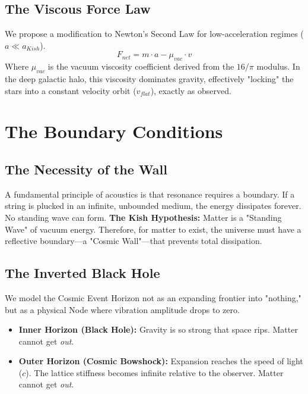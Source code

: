 \documentclass[11pt, letterpaper, openany]{book}
\begin{document}
\section{The Viscous Force Law}
We propose a modification to Newton's Second Law for low-acceleration regimes ($ a \ll a_{Kish} $).
\begin{equation}
    F_{net} = m \cdot a - \mu_{vac} \cdot v
\end{equation}
Where $\mu_{vac}$ is the vacuum viscosity coefficient derived from the $16/\pi$ modulus.
In the deep galactic halo, this viscosity dominates gravity, effectively "locking" the stars into a constant velocity orbit ($ v_{flat} $), exactly as observed.

\chapter{The Boundary Conditions}
\label{chap:boundary_conditions}

\section{The Necessity of the Wall}
A fundamental principle of acoustics is that resonance requires a boundary.
If a string is plucked in an infinite, unbounded medium, the energy dissipates forever. No standing wave can form.
\textbf{The Kish Hypothesis:} Matter is a "Standing Wave" of vacuum energy. Therefore, for matter to exist, the universe must have a reflective boundary---a "Cosmic Wall"---that prevents total dissipation.

\section{The Inverted Black Hole}
We model the Cosmic Event Horizon not as an expanding frontier into "nothing," but as a physical Node where vibration amplitude drops to zero.
\begin{itemize}
    \item \textbf{Inner Horizon (Black Hole):} Gravity is so strong that space rips. Matter cannot get \textit{out}.
    \item \textbf{Outer Horizon (Cosmic Bowshock):} Expansion reaches the speed of light ($c$). The lattice stiffness becomes infinite relative to the observer. Matter cannot get \textit{out}.
\end{itemize}
\end{document}
